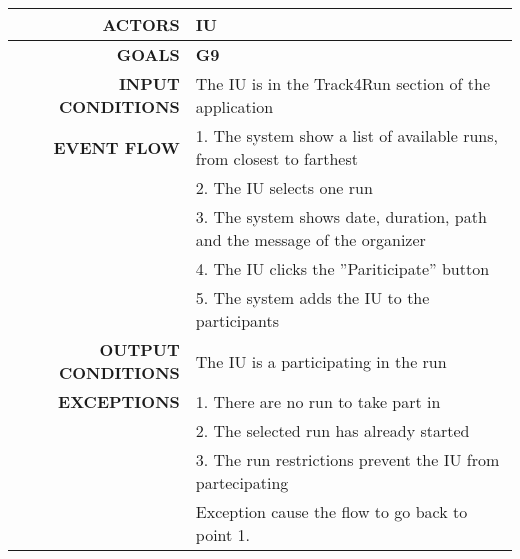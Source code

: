 \begin{table}[h!]
\begin{tabular}{|r|p{3in}|}
\hline
\textbf{ACTORS} & IU\\
\hline
\textbf{GOALS} & \textbf{G9}\\
\hline
\textbf{INPUT CONDITIONS} & The IU is in the Track4Run section of the application \\
\hline
\textbf{EVENT FLOW} 
&1. The system show a list of available runs, from closest to farthest \\
&2. The IU selects one run \\
&3. The system shows date, duration, path and the message of the organizer\\
&4. The IU clicks the ''Pariticipate'' button\\
&5. The system adds the IU to the participants\\
\hline
\textbf{OUTPUT CONDITIONS} & The IU is a participating in the run\\
\hline
\textbf{EXCEPTIONS} 
&1. There are no run to take part in\\
&2. The selected run has already started\\
&3. The run restrictions prevent the IU from partecipating\\
&Exception cause the flow to go back to point 1.\\
\hline
\end{tabular}
\end{table}